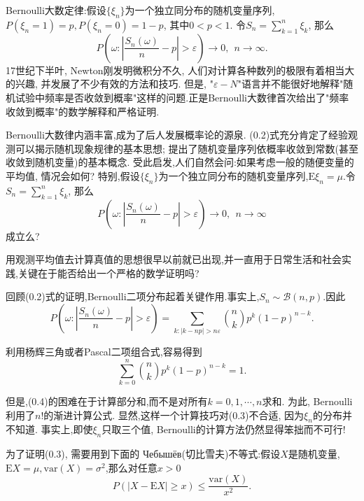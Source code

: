 Bernoulli大数定律:假设$\{\xi_n\}$为一个独立同分布的随机变量序列,$P(\xi_n = 1) = p, P(\xi_n = 0) = 1-p$, 其中$0<p<1$. 令$S_n = \sum_{k=1}^{n}\xi_k$, 那么
\begin{equation}
	P\left(\omega:\left|\frac{S_n(\omega)}{n}-p\right|>\varepsilon \right)\to 0,~~n\to\infty.
\end{equation}
17世纪下半叶, Newton刚发明微积分不久, 人们对计算各种数列的极限有着相当大的兴趣, 并发展了不少有效的方法和技巧. 但是, "$\varepsilon-N$"语言并不能很好地解释"随机试验中频率是否收敛到概率"这样的问题.正是Bernoulli大数律首次给出了"频率收敛到概率"的数学解释和严格证明.

Bernoulli大数律内涵丰富,成为了后人发展概率论的源泉. (0.2)式充分肯定了经验观测可以揭示随机现象规律的基本思想; 提出了随机变量序列依概率收敛到常数(甚至收敛到随机变量)的基本概念. 受此启发,人们自然会问:如果考虑一般的随便变量的平均值, 情况会如何? 特别,假设$\{\xi_n\}$为一个独立同分布的随机变量序列,$\mathrm{E}\xi_n = \mu$.令$S_n = \sum_{k=1}^{n}\xi_k$, 那么\begin{equation}
P\left(\omega:\left|\frac{S_n(\omega)}{n}-p\right|>\varepsilon \right)\to 0,~~n\to\infty
\end{equation}成立么?

用观测平均值去计算真值的思想很早以前就已出现,并一直用于日常生活和社会实践,关键在于能否给出一个严格的数学证明吗?

回顾(0.2)式的证明,Bernoulli二项分布起着关键作用.事实上,$S_n\sim \mathcal{B}(n,p)$.因此
\begin{equation}
	P\left(\omega:\left|\frac{S_n(\omega)}{n}-p\right|>\varepsilon \right)	= \sum_{k:|k-np|>n\varepsilon}\binom{n}{k}p^k(1-p)^{n-k}.	
\end{equation}

利用杨辉三角或者Pascal二项组合式,容易得到\begin{equation}
	\sum_{k=0}^n\binom{n}{k}p^k(1-p)^{n-k} = 1.	
\end{equation}

但是,(0.4)的困难在于计算部分和,而不是对所有$k=0,1,\cdots,n$求和. 为此, Bernoulli利用了$n!$的渐进计算公式. 显然,这样一个计算技巧对(0.3)不合适, 因为$\xi_n$的分布并不知道. 事实上,即使$\xi_n$只取三个值, Bernoulli的计算方法仍然显得笨拙而不可行!

为了证明(0.3), 需要用到下面的 Чебышёв(切比雪夫)不等式:假设$X$是随机变量, $\mathrm{E}X = \mu,\mathrm{var}(X) = \sigma^2$,那么对任意$x>0$
\begin{equation}
	P(|X-\mathrm{E}X|\geqslant x)\leqslant \frac{\mathrm{var}(X)}{x^2}.
\end{equation}

